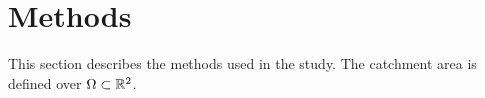 \section{Methods}

This section describes the methods used in the study.
The catchment area is defined over $\Omega \subset \mathbb{R}^2$.